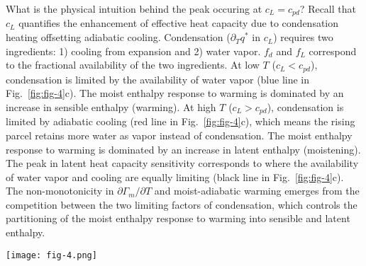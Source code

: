 \documentclass[]{ametsocV6.1}
\begin{document}
What is the physical intuition behind the peak occuring at $c_L = c_{pd}$? Recall that $c_L$ quantifies the enhancement of effective heat capacity due to condensation heating offsetting adiabatic cooling. Condensation ($\partial_T q^*$ in $c_L$) requires two ingredients: 1) cooling from expansion and 2) water vapor. $f_d$ and $f_L$ correspond to the fractional availability of the two ingredients. At low $T$ ($c_L < c_{pd}$), condensation is limited by the availability of water vapor (blue line in Fig.~\ref{fig:fig-4}c). The moist enthalpy response to warming is dominated by an increase in sensible enthalpy (warming). At high $T$ ($c_L > c_{pd}$), condensation is limited by adiabatic cooling (red line in Fig.~\ref{fig:fig-4}c), which means the rising parcel retains more water as vapor instead of condensation. The moist enthalpy response to warming is dominated by an increase in latent enthalpy (moistening). The peak in latent heat capacity sensitivity corresponds to where the availability of water vapor and cooling are equally limiting (black line in Fig.~\ref{fig:fig-4}c). The non-monotonicity in $\partial\Gamma_m/\partial T$ and moist-adiabatic warming emerges from the competition between the two limiting factors of condensation, which controls the partitioning of the moist enthalpy response to warming into sensible and latent enthalpy.

\begin{figure*}[htbp]
 \centering
 \texttt{[image: fig-4.png]}\\
 \caption{The latent heat capacity sensitivity is decomposed into a product of four terms (Eq.~\ref{eq:term_b_intermediate}) that vary monotonically with local temperature $T$, where local means at pressure $p$. (a) The latent volume ratio $\tilde{\alpha}$ increases exponentially with $T$ (dashed) while the fractional change in latent heat capacity $c_L$ to a fractional change in $T$ decreases approximately linearly with $T$ (dotted). The product of the two is weakly non-monotonic with $T$ where the product has a local minimum (dash-dot). (b) The local minimum across the pressure-surface temperature space approximately occurs where $\tilde{\alpha}= R_v T / L_v$ (white line). (c) The latent fraction of effective heat capacity $f_L$ increases logistically with $T$ (blue line) while the sensible fraction $f_d$ decreases logistically with $T$ (red line). The product of the two is non-monotonic with $T$ where the product has a local maximum (purple line). (d) The $f_d\cdot f_L$ local maximum across the pressure-surface temperature space occurs where $c_L=c_{pd}$ (black line).}\label{fig:fig-4}
\end{figure*}
\end{document}
